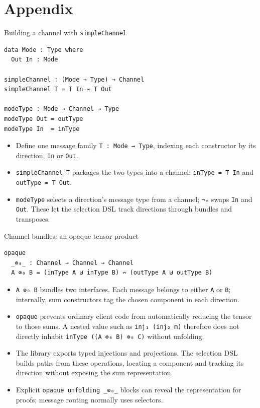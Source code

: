 \documentclass[aspectratio=169,10pt]{beamer}
\newcommand{\agda}[1]{\texttt{#1}}
\begin{document}
\appendix
\section{Appendix}

\begin{frame}[fragile]{Building a channel with \agda{simpleChannel}}
\begin{verbatim}
data Mode : Type where
  Out In : Mode

simpleChannel : (Mode → Type) → Channel
simpleChannel T = T In ⇿ T Out

modeType : Mode → Channel → Type
modeType Out = outType
modeType In  = inType
\end{verbatim}
  \begin{itemize}
    \item Define one message family \agda{T : Mode → Type}, indexing each
          constructor by its direction, \agda{In} or \agda{Out}.
    \item \agda{simpleChannel T} packages the two types into a channel:
          \agda{inType = T In} and \agda{outType = T Out}.
    \item \agda{modeType} selects a direction's message type from a channel;
          \agda{¬ₘ} swaps \agda{In} and \agda{Out}.  These let the selection
          DSL track directions through bundles and transposes.
  \end{itemize}
\end{frame}

\begin{frame}[fragile]{Channel bundles: an opaque tensor product}
\begin{verbatim}
opaque
  _⊗₀_ : Channel → Channel → Channel
  A ⊗₀ B = (inType A ⊎ inType B) ⇿ (outType A ⊎ outType B)
\end{verbatim}
  \begin{itemize}
    \item \agda{A ⊗₀ B} bundles two interfaces.  Each message belongs to
          either \agda{A} or \agda{B}; internally, sum constructors tag the
          chosen component in each direction.
    \item \agda{opaque} prevents ordinary client code from automatically
          reducing the tensor to those sums.  A nested value such as
          \agda{inj₁ (inj₂ m)} therefore does not directly inhabit
          \agda{inType ((A ⊗₀ B) ⊗₀ C)} without unfolding.
    \item The library exports typed injections and projections.  The
          selection DSL builds paths from these operations, locating a
          component and tracking its direction without exposing the sum
          representation.
    \item Explicit \agda{opaque unfolding \_⊗₀\_} blocks can reveal the
          representation for proofs; message routing normally uses selectors.
  \end{itemize}
\end{frame}
\end{document}

